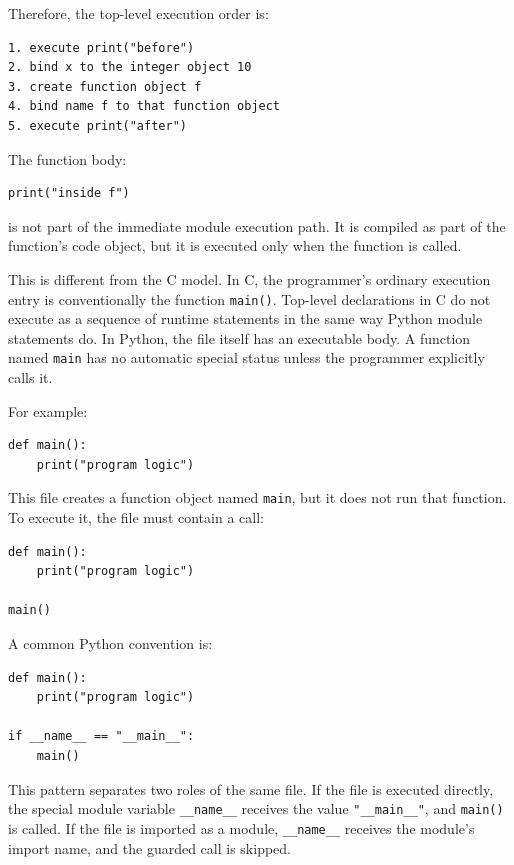 \documentclass[a4paper,twoside]{report}
\begin{document}
Therefore, the top-level execution order is:

\begin{verbatim}
1. execute print("before")
2. bind x to the integer object 10
3. create function object f
4. bind name f to that function object
5. execute print("after")
\end{verbatim}

The function body:

\begin{verbatim}
print("inside f")
\end{verbatim}

is not part of the immediate module execution path. It is compiled as part of the function's code object, but it is executed only when the function is called.

This is different from the C model. In C, the programmer's ordinary execution entry is conventionally the function \texttt{main()}. Top-level declarations in C do not execute as a sequence of runtime statements in the same way Python module statements do. In Python, the file itself has an executable body. A function named \texttt{main} has no automatic special status unless the programmer explicitly calls it.

For example:

\begin{verbatim}
def main():
    print("program logic")
\end{verbatim}

This file creates a function object named \texttt{main}, but it does not run that function. To execute it, the file must contain a call:

\begin{verbatim}
def main():
    print("program logic")

main()
\end{verbatim}

A common Python convention is:

\begin{verbatim}
def main():
    print("program logic")

if __name__ == "__main__":
    main()
\end{verbatim}

This pattern separates two roles of the same file. If the file is executed directly, the special module variable \texttt{\_\_name\_\_} receives the value \texttt{"\_\_main\_\_"}, and \texttt{main()} is called. If the file is imported as a module, \texttt{\_\_name\_\_} receives the module's import name, and the guarded call is skipped.
\end{document}
